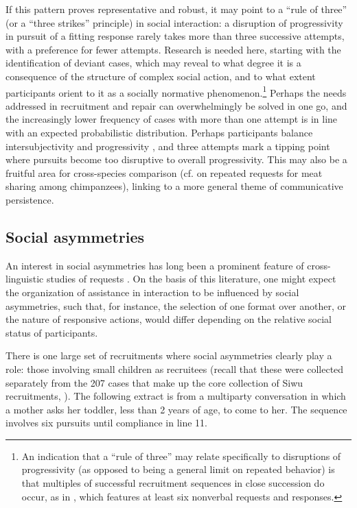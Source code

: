 \documentclass[output=paper]{langsci/langscibook}
\begin{document}
If this pattern proves representative and robust, it may point to a “rule of three” (or a “three strikes” principle) in social interaction: a disruption of progressivity in pursuit of a fitting response rarely takes more than three successive attempts, with a preference for fewer attempts. Research is needed here, starting with the identification of deviant cases, which may reveal to what degree it is a consequence of the structure of complex social action, and to what extent participants orient to it as a socially normative phenomenon.\footnote{An indication that a “rule of three” may relate specifically to disruptions of progressivity (as opposed to being a general limit on repeated behavior) is that multiples of successful recruitment sequences in close succession do occur, as in , which features at least six nonverbal requests and responses.} Perhaps the needs addressed in recruitment and repair can overwhelmingly be solved in one go, and the increasingly lower frequency of cases with more than one attempt is in line with an expected probabilistic distribution. Perhaps participants balance intersubjectivity and progressivity \citep{heritage_intersubjectivity_2007}, and three attempts mark a tipping point where pursuits become too disruptive to overall progressivity. This may also be a fruitful area for cross-species comparison (cf. \citealt{wilkinson_requesting_2012} on repeated requests for meat sharing among chimpanzees), linking to a more general theme of communicative persistence.

\subsection{Social asymmetries}\label{sec:dingemanse:5.2}

An interest in social asymmetries has long been a prominent feature of cross-linguistic studies of requests \citep{brown_universals_1978,blum-kulka_cross-cultural_1989}. On the basis of this literature, one might expect the organization of assistance in interaction to be influenced by social asymmetries, such that, for instance, the selection of one format over another, or the nature of responsive actions, would differ depending on the relative social status of participants.

There is one large set of recruitments where social asymmetries clearly play a role: those involving small children as recruitees (recall that these were collected separately from the 207 cases that make up the core collection of Siwu recruitments, ). The following extract is from a multiparty conversation in which a mother asks her toddler, less than 2 years of age, to come to her. The sequence involves six pursuits until compliance in line 11.
\end{document}
